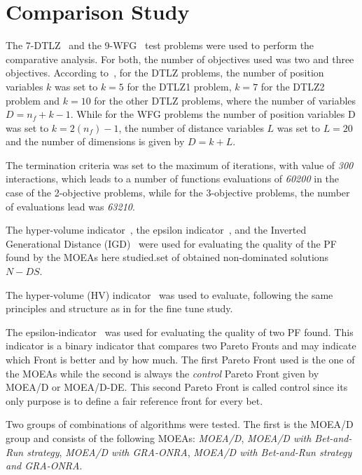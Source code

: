\section{Comparison Study}

The 7-DTLZ~\cite{deb2005scalable} and the 9-WFG~\cite{huband2006review} test problems were used to perform the comparative analysis. For both, the number of objectives used was two and three objectives. According to~\cite{deb2005scalable}, for the DTLZ problems, the number of position variables $k$ was set to $k = 5$ for the DTLZ1 problem, $k = 7$ for the DTLZ2 problem and $k = 10$ for the other DTLZ problems, where the number of variables $D = n_f + k -1$. While for the WFG problems the number of position variables D was set to $k = 2(n_f) - 1$, the number of distance variables $L$ was set to $L = 20$ and the number of dimensions is given by $D = k + L$.

The termination criteria was set to the maximum of iterations, with value of \textit{300} interactions, which leads to a number of functions evaluations of \textit{60200} in the case of the 2-objective problems, while for the 3-objective problems, the number of evaluations lead was \textit{63210}.


The hyper-volume indicator~\cite{zitzler1998multiobjective}, the epsilon indicator~\cite{zitzler2003performance}, and the Inverted Generational Distance (IGD)~\cite{zitzler2003performance} were used for evaluating the quality of the PF found by the MOEAs here studied.set of obtained non-dominated solutions $N-DS$.

The hyper-volume (HV) indicator~\cite{zitzler1998multiobjective} was used to evaluate, following the same principles and structure as in for the fine tune study.

The epsilon-indicator~\cite{zitzler2003performance} was used for evaluating the quality of two PF found. This indicator is a binary indicator that compares two Pareto Fronts and may indicate which Front is better and by how much. The first Pareto Front used is the one of the MOEAs while the second is always the \textit{control} Pareto Front given by MOEA/D or MOEA/D-DE. This second Pareto Front is called control since its only purpose is to define a fair reference front for every bet.


Two groups of combinations of algorithms were tested. The first is the MOEA/D group and consists of the following MOEAs: \textit{MOEA/D}, \textit{MOEA/D with Bet-and-Run strategy}, \textit{MOEA/D with GRA-ONRA},  \textit{MOEA/D with Bet-and-Run strategy and GRA-ONRA}.


